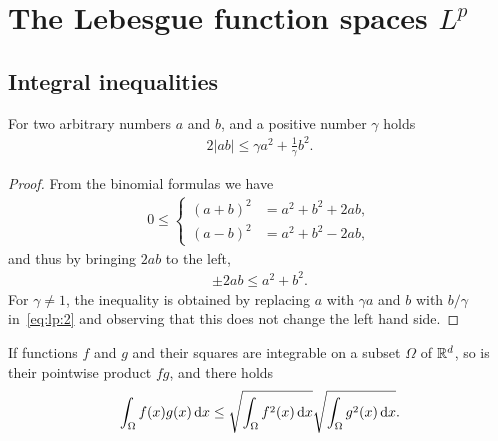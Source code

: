 
\section{The Lebesgue function spaces $L^p$}
\label{sec:lp}

\subsection{Integral inequalities}

\begin{lemma}
  For two arbitrary numbers $a$ and $b$, and a positive number
  $\gamma$ holds
  \begin{gather}
    \label{eq:lp:1}
    2\left|ab\right| \le \gamma a^2 + \frac1\gamma b^2.
  \end{gather}
\end{lemma}
\begin{proof}
  From the binomial formulas we have
  \begin{gather*}
    0 \le
    \begin{cases}
      (a+b)^2 &= a^2+b^2+2ab,
      \\
      (a-b)^2 &= a^2+b^2-2ab,
    \end{cases}
  \end{gather*}
  and thus by bringing $2ab$ to the left,
  \begin{gather}
    \label{eq:lp:2}
    \pm 2ab \le a^2+b^2.
  \end{gather}
  For $\gamma \neq 1$, the inequality is obtained by replacing $a$
  with $\gamma a$ and $b$ with $b/\gamma$ in~\eqref{eq:lp:2} and
  observing that this does not change the left hand side.
\end{proof}

\begin{lemma}
  If functions $f$ and $g$ and their squares are integrable on a
  subset $\Omega$ of $\mathbb R^d$, so is their pointwise product $fg$, and
  there holds
  \begin{gather}
    \label{eq:lp:3}
    \int_\Omega f(x)g(x)\,\mathrm{d} x \le \sqrt{\int_\Omega f^2(x)\,\mathrm{d} x} \sqrt{\int_\Omega g^2(x)\,\mathrm{d} x}.
  \end{gather}
\end{lemma}

